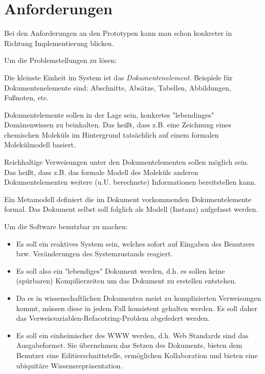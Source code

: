\section{Anforderungen}

Bei den Anforderungen an den Prototypen kann man schon
konkreter in Richtung Implementierung blicken.

Um die Problemstellungen zu lösen:

Die kleinste Einheit im System ist das \emph{Dokumentenelement}.
Beispiele für Dokumentenelemente sind: Abschnitte, Absätze, Tabellen, Abbildungen, Fußnoten, etc.

Dokumentelemente sollen in der Lage sein, konkretes "lebendinges" Domänenwissen zu beinhalten.
Das heißt, dass z.B. eine Zeichnung eines chemischen Moleküls im Hintergrund tatsächlich
auf einem formalen Molekülmodell basiert.

Reichhaltige Verweisungen unter den Dokumentelementen sollen möglich sein.
Das heißt, dass z.B. das formale Modell des Moleküls
anderen Dokumentelementen weitere (u.U. berechnete) Informationen bereitstellen kann.

Ein Metamodell definiert die im Dokument vorkommenden Dokumentelemente formal.
Das Dokument selbst soll folglich als Modell (Instanz) aufgefasst werden.

Um die Software benutzbar zu machen:

\begin{itemize}
  \item Es soll ein reaktives System sein, welches sofort auf Eingaben des Benutzers bzw. Veränderungen des Systemzustands reagiert.
  \item Es soll also ein "lebendiges" Dokument werden, d.h. es sollen keine (spürbaren) Kompilierzeiten um das Dokument zu erstellen entstehen.
  \item Da es in wissenschaftlichen Dokumenten meist zu komplizierten Verweisungen kommt, müssen diese in jedem Fall konsistent gehalten werden. Es soll daher das Verweisvariablen-Refacotring-Problem abgefedert werden.
  \item Es soll ein einheimischer des WWW werden, d.h. Web Standards sind das Ausgabeformet. Sie übernehmen das Setzen des Dokuments, bieten dem Benutzer eine Editierschnittstelle, ermöglichen Kollaboration und bieten eine ubiquitäre Wissensrepräsentation.
\end{itemize}

